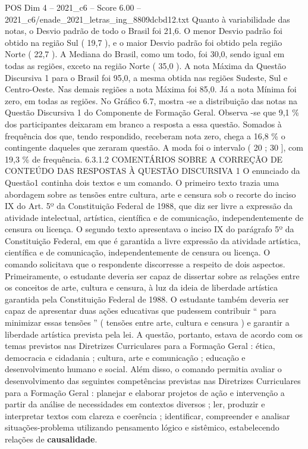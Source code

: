\begin{textsample}{POS Dim 4 – 2021\_c6 – Score 6.00 – 2021\_c6/enade\_2021\_letras\_ing\_8809dcbd12.txt}
Quanto à variabilidade das notas, o Desvio padrão de todo o Brasil foi 21,6.
O menor Desvio padrão foi obtido na região Sul ( 19,7 ), e o maior Desvio padrão foi obtido pela região Norte ( 22,7 ).
A Mediana do Brasil, como um todo, foi 30,0, sendo igual em todas as regiões, exceto na região Norte ( 35,0 ).
A nota Máxima da Questão Discursiva 1 para o Brasil foi 95,0, a mesma obtida nas regiões Sudeste, Sul e Centro-Oeste.
Nas demais regiões a nota Máxima foi 85,0.
Já a nota Mínima foi zero, em todas as regiões.
No Gráfico 6.7, mostra -se a distribuição das notas na Questão Discursiva 1 do Componente de Formação Geral.
Observa -se que 9,1 \% dos participantes deixaram em branco a resposta a essa questão.
Somados à frequência dos que, tendo respondido, receberam nota zero, chega a 16,8 \% o contingente daqueles que zeraram questão.
A moda foi o intervalo ( 20 ; 30 ], com 19,3 \% de frequência. 6.3.1.2 COMENTÁRIOS SOBRE A CORREÇÃO DE CONTEÚDO DAS RESPOSTAS À QUESTÃO DISCURSIVA 1 O enunciado da Questão1 continha dois textos e um comando.
O primeiro texto trazia uma abordagem sobre as tensões entre cultura, arte e censura sob o recorte do inciso IX do Art. 5º da Constituição Federal de 1988, que diz ser livre a expressão da atividade intelectual, artística, científica e de comunicação, independentemente de censura ou licença.
O segundo texto apresentava o inciso IX do parágrafo 5º da Constituição Federal, em que é garantida a livre expressão da atividade artística, científica e de comunicação, independentemente de censura ou licença.
O comando solicitava que o respondente discorresse a respeito de dois aspectos.
Primeiramente, o estudante deveria ser capaz de dissertar sobre as relações entre os conceitos de arte, cultura e censura, à luz da ideia de liberdade artística garantida pela Constituição Federal de 1988.
O estudante também deveria ser capaz de apresentar duas ações educativas que pudessem contribuir “ para minimizar essas tensões ” ( tensões entre arte, cultura e censura ) e garantir a liberdade artística prevista pela lei.
A questão, portanto, estava de acordo com os temas previstos nas Diretrizes Curriculares para a Formação Geral : ética, democracia e cidadania ; cultura, arte e comunicação ; educação e desenvolvimento humano e social.
Além disso, o comando permitia avaliar o desenvolvimento das seguintes competências previstas nas Diretrizes Curriculares para a Formação Geral : planejar e elaborar projetos de ação e intervenção a partir da análise de necessidades em contextos diversos ; ler, produzir e interpretar textos com clareza e coerência ; identificar, compreender e analisar situações-problema utilizando pensamento lógico e sistêmico, estabelecendo relações de \textbf{causalidade}.

\end{textsample}
